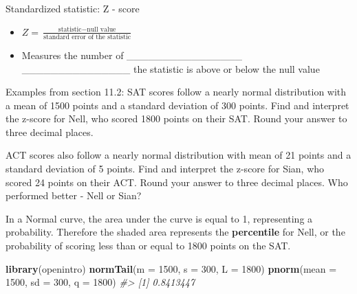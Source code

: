 \documentclass[
]{report}
\newenvironment{Shaded}{\begin{snugshade}}{\end{snugshade}}
\newcommand{\AttributeTok}[1]{\textcolor[rgb]{0.13,0.29,0.53}{#1}}
\newcommand{\CommentTok}[1]{\textcolor[rgb]{0.56,0.35,0.01}{\textit{#1}}}
\newcommand{\DecValTok}[1]{\textcolor[rgb]{0.00,0.00,0.81}{#1}}
\newcommand{\FunctionTok}[1]{\textcolor[rgb]{0.13,0.29,0.53}{\textbf{#1}}}
\newcommand{\NormalTok}[1]{#1}
\providecommand{\tightlist}{%
  \setlength{\itemsep}{0pt}\setlength{\parskip}{0pt}}
\begin{document}
Standardized statistic: Z - score

\vspace{1mm}

\begin{itemize}
\tightlist
\item
  \(Z = \frac{\mbox{statistic} - \mbox{null value}}{\mbox{standard error of the statistic}}\)
\end{itemize}

\vspace{0.5in}

\begin{itemize}
\tightlist
\item
  Measures the number of \_\_\_\_\_\_\_\_\_\_\_\_\_\_\_\_ \_\_\_\_\_\_\_\_\_\_\_\_\_\_\_ the statistic is above or below the null value
\end{itemize}

Examples from section 11.2: SAT scores follow a nearly normal distribution with a mean of 1500 points and a standard deviation of 300 points. Find and interpret the z-score for Nell, who scored 1800 points on their SAT. Round your answer to three decimal places.

\vspace{0.6in}

ACT scores also follow a nearly normal distribution with mean of 21 points and a standard deviation of 5 points. Find and interpret the z-score for Sian, who scored 24 points on their ACT. Round your answer to three decimal places. Who performed better - Nell or Sian?

\vspace{0.6in}

In a Normal curve, the area under the curve is equal to 1, representing a probability. Therefore the shaded area represents the \textbf{percentile} for Nell, or the probability of scoring less than or equal to 1800 points on the SAT.

\begin{Shaded}
\begin{Highlighting}[]
\FunctionTok{library}\NormalTok{(openintro)}
\FunctionTok{normTail}\NormalTok{(}\AttributeTok{m =} \DecValTok{1500}\NormalTok{, }\AttributeTok{s =} \DecValTok{300}\NormalTok{, }\AttributeTok{L =} \DecValTok{1800}\NormalTok{)}
\FunctionTok{pnorm}\NormalTok{(}\AttributeTok{mean =} \DecValTok{1500}\NormalTok{, }\AttributeTok{sd =} \DecValTok{300}\NormalTok{, }\AttributeTok{q =} \DecValTok{1800}\NormalTok{)}
\CommentTok{\#\textgreater{} [1] 0.8413447}
\end{Highlighting}
\end{Shaded}
\end{document}
